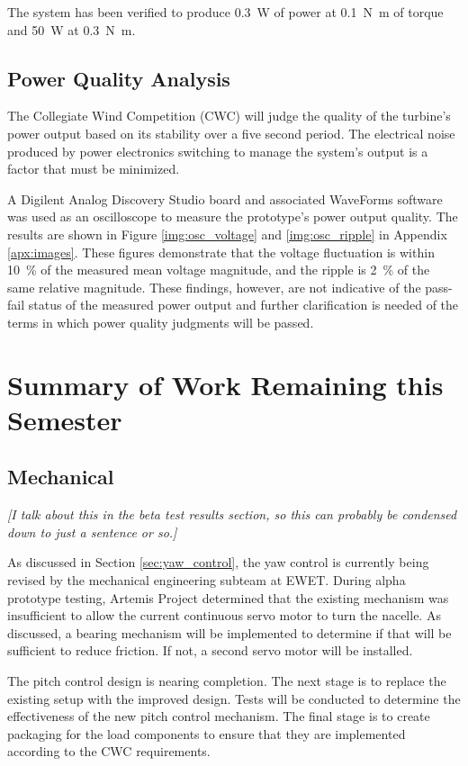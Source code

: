 \documentclass[11pt,letterpaper,conference]{IEEEtran}
\begin{document}
The system has been verified to produce \qty{.3}{\W} of power at
\qty{.1}{\newton\m} of torque and \qty{50}{\W} at \qty{.3}{\newton\m}.

\subsection{Power Quality Analysis}

The Collegiate Wind Competition (CWC) will judge the quality of the turbine's
power output based on its stability over a five second period. The electrical
noise produced by power electronics switching to manage the system's output is a
factor that must be minimized.

A Digilent Analog Discovery Studio board and associated WaveForms software was
used as an oscilloscope to measure the prototype's power output quality. The
results are shown in Figure \ref{img:osc_voltage} and \ref{img:osc_ripple} in
Appendix \ref{apx:images}. These figures demonstrate that the voltage
fluctuation is within \qty{10}{\percent} of the measured mean voltage
magnitude, and the ripple is \qty{2}{\percent} of the same relative magnitude.
These findings, however, are not indicative of the pass-fail status of the
measured power output and further clarification is needed of the terms in which
power quality judgments will be passed.

\section{Summary of Work Remaining this Semester}
\subsection{Mechanical}

\emph{[I talk about this in the beta test results section, so this can probably be condensed down to just a sentence or so.]}

As discussed in Section \ref{sec:yaw_control}, the yaw control is currently
being revised by the mechanical engineering subteam at EWET. During alpha
prototype testing, Artemis Project determined that the existing mechanism was
insufficient to allow the current continuous servo motor to turn the nacelle.
As discussed, a bearing mechanism will be implemented to determine if that
will be sufficient to reduce friction. If not, a second servo motor will be
installed.

The pitch control design is nearing completion. The next stage is to replace
the existing setup with the improved design. Tests will be conducted to
determine the effectiveness of the new pitch control mechanism. The final stage
is to create packaging for the load components to ensure that they are
implemented according to the CWC requirements.
\end{document}
